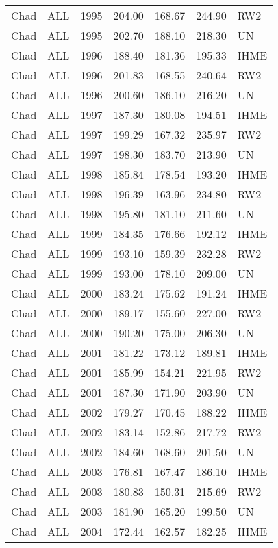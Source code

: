 \begin{longtable}{lllrrrl}
  Chad & ALL & 1995 & 204.00 & 168.67 & 244.90 & RW2 \\ 
  Chad & ALL & 1995 & 202.70 & 188.10 & 218.30 & UN \\ 
  Chad & ALL & 1996 & 188.40 & 181.36 & 195.33 & IHME \\ 
  Chad & ALL & 1996 & 201.83 & 168.55 & 240.64 & RW2 \\ 
  Chad & ALL & 1996 & 200.60 & 186.10 & 216.20 & UN \\ 
  Chad & ALL & 1997 & 187.30 & 180.08 & 194.51 & IHME \\ 
  Chad & ALL & 1997 & 199.29 & 167.32 & 235.97 & RW2 \\ 
  Chad & ALL & 1997 & 198.30 & 183.70 & 213.90 & UN \\ 
  Chad & ALL & 1998 & 185.84 & 178.54 & 193.20 & IHME \\ 
  Chad & ALL & 1998 & 196.39 & 163.96 & 234.80 & RW2 \\ 
  Chad & ALL & 1998 & 195.80 & 181.10 & 211.60 & UN \\ 
  Chad & ALL & 1999 & 184.35 & 176.66 & 192.12 & IHME \\ 
  Chad & ALL & 1999 & 193.10 & 159.39 & 232.28 & RW2 \\ 
  Chad & ALL & 1999 & 193.00 & 178.10 & 209.00 & UN \\ 
  Chad & ALL & 2000 & 183.24 & 175.62 & 191.24 & IHME \\ 
  Chad & ALL & 2000 & 189.17 & 155.60 & 227.00 & RW2 \\ 
  Chad & ALL & 2000 & 190.20 & 175.00 & 206.30 & UN \\ 
  Chad & ALL & 2001 & 181.22 & 173.12 & 189.81 & IHME \\ 
  Chad & ALL & 2001 & 185.99 & 154.21 & 221.95 & RW2 \\ 
  Chad & ALL & 2001 & 187.30 & 171.90 & 203.90 & UN \\ 
  Chad & ALL & 2002 & 179.27 & 170.45 & 188.22 & IHME \\ 
  Chad & ALL & 2002 & 183.14 & 152.86 & 217.72 & RW2 \\ 
  Chad & ALL & 2002 & 184.60 & 168.60 & 201.50 & UN \\ 
  Chad & ALL & 2003 & 176.81 & 167.47 & 186.10 & IHME \\ 
  Chad & ALL & 2003 & 180.83 & 150.31 & 215.69 & RW2 \\ 
  Chad & ALL & 2003 & 181.90 & 165.20 & 199.50 & UN \\ 
  Chad & ALL & 2004 & 172.44 & 162.57 & 182.25 & IHME \\ 

\end{longtable}
